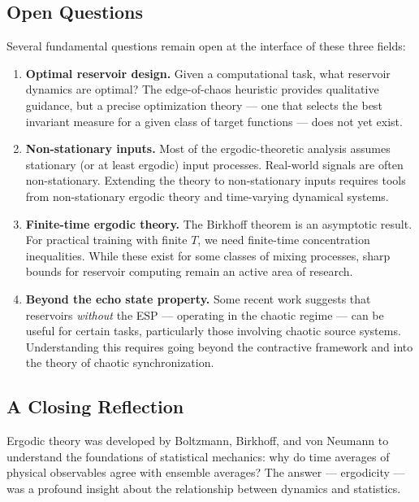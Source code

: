 \subsection{Open Questions}\label{sec:16.7.3}

Several fundamental questions remain open at the interface of these three fields:

\begin{enumerate}[nosep]
  \item \textbf{Optimal reservoir design.} Given a computational task, what reservoir dynamics are optimal? The edge-of-chaos heuristic provides qualitative guidance, but a precise optimization theory --- one that selects the best invariant measure for a given class of target functions --- does not yet exist.

  \item \textbf{Non-stationary inputs.} Most of the ergodic-theoretic analysis assumes stationary (or at least ergodic) input processes. Real-world signals are often non-stationary. Extending the theory to non-stationary inputs requires tools from non-stationary ergodic theory and time-varying dynamical systems.

  \item \textbf{Finite-time ergodic theory.} The Birkhoff theorem is an asymptotic result. For practical training with finite $T$, we need finite-time concentration inequalities. While these exist for some classes of mixing processes, sharp bounds for reservoir computing remain an active area of research.

  \item \textbf{Beyond the echo state property.} Some recent work suggests that reservoirs \textit{without} the ESP --- operating in the chaotic regime --- can be useful for certain tasks, particularly those involving chaotic source systems. Understanding this requires going beyond the contractive framework and into the theory of chaotic synchronization.
\end{enumerate}

\subsection{A Closing Reflection}\label{sec:16.7.4}

Ergodic theory was developed by Boltzmann, Birkhoff, and von Neumann to understand the foundations of statistical mechanics: why do time averages of physical observables agree with ensemble averages? The answer --- ergodicity --- was a profound insight about the relationship between dynamics and statistics.

